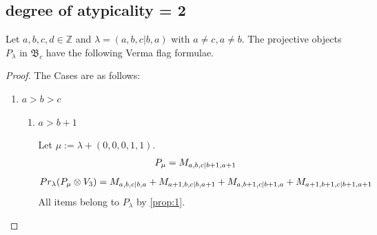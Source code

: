 

\subsection{degree of atypicality = 2}
\begin{theorem}
  Let $a,b,c,d \in \mathbb{Z}$ and $\lambda = (a,b,c|b,a)$ with $a \neq c, a\neq b$. The projective objects $P_{\lambda}$ in $\mathfrak{B}_{c}$ have the following Verma flag formulae.
\end{theorem}
\begin{proof} The Cases are as follows:\par
  \begin{enumerate}
    \item $a>b>c$
      \begin{enumerate}
        \item $a>b+1$ \par
        Let $\mu:=\lambda + (0,0,0,1,1) $.
        \begin{equation}\notag
          \begin{aligned}
            P_\mu = M_{a,b,c|b+1,a+1}
          \end{aligned}
        \end{equation}
        \begin{equation}\notag
          \begin{aligned}
            Pr_{\lambda}(P_\mu \otimes V_{3}) &=
M_{a,b,c|b,a}
+ M_{a+1,b,c|b,a+1}
+ M_{a,b+1,c|b+1,a}
+ M_{a+1,b+1,c|b+1,a+1} 
          \end{aligned}
        \end{equation}
All items belong to $P_\lambda$ by \cref{prop:1}.


\end{enumerate}
\end{enumerate}
\end{proof}
